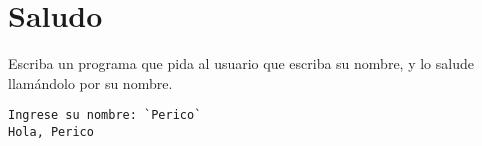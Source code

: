 \section{Saludo}

Escriba un programa que pida al usuario que escriba su nombre, y lo
salude llamándolo por su nombre.

\begin{lstlisting}[language=testcase]
Ingrese su nombre: `Perico`
Hola, Perico
\end{lstlisting}
